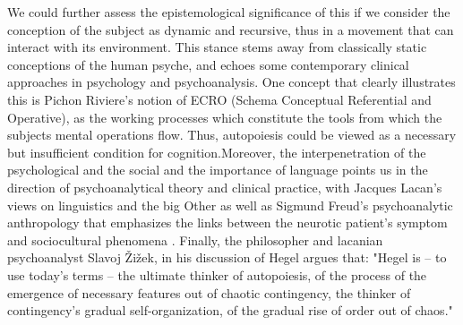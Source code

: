 \documentclass[fleqn,10pt]{wlscirep}
\begin{document}
We could further assess the epistemological significance of this if we consider the conception of the subject as dynamic and recursive, thus in a movement that can interact with its environment. This stance stems away from classically static conceptions of the human psyche, and echoes some contemporary clinical approaches in psychology and psychoanalysis. One concept that clearly illustrates this is Pichon Riviere’s  notion of ECRO (Schema Conceptual Referential and Operative), as the working processes which constitute the tools from which the subjects mental operations flow\cite{pichon_riviere_processus_2004}. Thus, autopoiesis could be viewed as a necessary but insufficient condition for cognition\cite{bitbol_autopoiesis_2004}.Moreover, the interpenetration of the psychological and the social and the importance of language points us in the direction of psychoanalytical theory and clinical practice, with Jacques Lacan’s views on linguistics and the big Other as well as Sigmund Freud’s psychoanalytic anthropology that emphasizes the links between the neurotic patient’s symptom and sociocultural phenomena \cite{freud_totem_1989}. Finally, the philosopher and lacanian psychoanalyst Slavoj Žižek, in his discussion of Hegel argues that: "Hegel is – to use today's terms – the ultimate thinker of autopoiesis, of the process of the emergence of necessary features out of chaotic contingency, the thinker of contingency's gradual self-organization, of the gradual rise of order out of chaos."\cite{zizek_less_2013}



\cite{straus1977societal}







\end{document}
